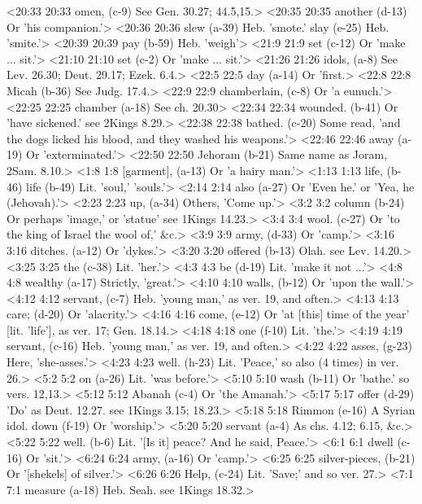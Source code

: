 <20:33 20:33  omen, (c-9)  See Gen. 30.27; 44.5,15.>
<20:35 20:35  another (d-13)  Or 'his companion.'>
<20:36 20:36  slew (a-39)  Heb. 'smote.'
  slay (e-25)  Heb. 'smite.'>
<20:39 20:39  pay (b-59)  Heb. 'weigh'>
<21:9 21:9  set (c-12) Or 'make ... sit.'>
<21:10 21:10  set (c-2)  Or 'make ... sit.'>
<21:26 21:26  idols, (a-8)  See Lev. 26.30; Deut. 29.17; Ezek. 6.4.>
<22:5 22:5  day (a-14)  Or 'first.>
<22:8 22:8  Micah (b-36)  See Judg. 17.4.>
<22:9 22:9  chamberlain, (c-8)  Or 'a eunuch.'>
<22:25 22:25  chamber (a-18)  See ch. 20.30>
<22:34 22:34  wounded. (b-41)  Or 'have sickened.' see 2Kings 8.29.>
<22:38 22:38  bathed. (c-20)  Some read, 'and the dogs licked his blood, and they washed  his weapons.'>
<22:46 22:46  away (a-19)  Or 'exterminated.'>
<22:50 22:50  Jehoram (b-21)  Same name as Joram, 2Sam. 8.10.>
<1:8 1:8  [garment], (a-13)  Or 'a hairy man.'>
<1:13 1:13  life, (b-46)  life (b-49)
  Lit. 'soul,' 'souls.'>
<2:14 2:14  also (a-27)  Or 'Even he.' or 'Yea, he (Jehovah).'>
<2:23 2:23  up, (a-34)  Others, 'Come up.'>
<3:2 3:2  column (b-24)  Or perhaps 'image,' or 'statue' see 1Kings 14.23.>
<3:4 3:4  wool. (c-27)  Or 'to the king of Israel the wool of,' &c.>
<3:9 3:9  army, (d-33)  Or 'camp.'>
<3:16 3:16  ditches. (a-12)  Or 'dykes.'>
<3:20 3:20  offered (b-13)  Olah. see Lev. 14.20.>
<3:25 3:25  the (c-38)  Lit. 'her.'>
<4:3 4:3  be (d-19)  Lit. 'make it not ...'>
<4:8 4:8  wealthy (a-17)  Strictly, 'great.'>
<4:10 4:10  walls, (b-12)  Or 'upon the wall.'>
<4:12 4:12  servant, (c-7) Heb. 'young man,' as ver. 19, and often.>
<4:13 4:13  care; (d-20)  Or 'alacrity.'>
<4:16 4:16  come, (e-12)  Or 'at [this] time of the year' [lit. 'life'], as ver. 17;  Gen. 18.14.>
<4:18 4:18  one (f-10)  Lit. 'the.'>
<4:19 4:19  servant, (c-16)  Heb. 'young man,' as ver. 19, and often.>
<4:22 4:22  asses, (g-23)  Here, 'she-asses.'>
<4:23 4:23  well. (h-23)  Lit. 'Peace,' so also (4 times) in ver. 26.>
<5:2 5:2  on (a-26)  Lit. 'was before.'>
<5:10 5:10  wash (b-11)  Or 'bathe.' so vers. 12,13.>
<5:12 5:12  Abanah (c-4)  Or 'the Amanah.'>
<5:17 5:17  offer (d-29)  'Do' as Deut. 12.27. see 1Kings 3.15; 18.23.>
<5:18 5:18  Rimmon (e-16)  A Syrian idol.
  down (f-19)  Or 'worship.'>
<5:20 5:20  servant (a-4)  As chs. 4.12; 6.15, &c.>
<5:22 5:22  well. (b-6)  Lit. '[Is it] peace? And he said, Peace.'>
<6:1 6:1  dwell (c-16)  Or 'sit.'>
<6:24 6:24  army, (a-16)  Or 'camp.'>
<6:25 6:25  silver-pieces, (b-21)  Or '[shekels] of silver.'>
<6:26 6:26  Help, (c-24)  Lit. 'Save;' and so ver. 27.>
<7:1 7:1  measure (a-18)  Heb. Seah. see 1Kings 18.32.>
